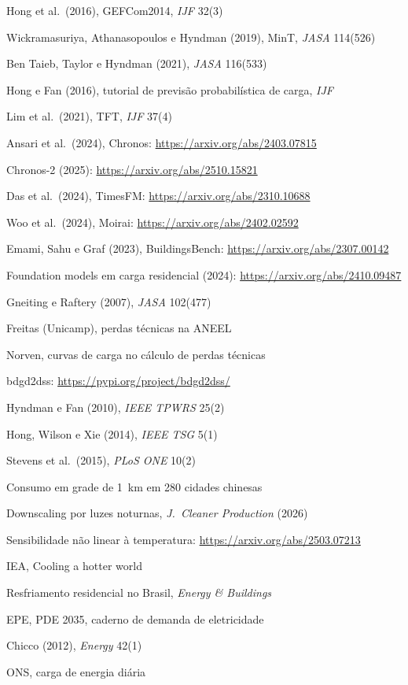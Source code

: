 {\begin{enumerate}[label={[\arabic*]},leftmargin=2.2em,itemsep=1pt]
\item Hong et al.\ (2016), GEFCom2014, \emph{IJF} 32(3)
\item Wickramasuriya, Athanasopoulos e Hyndman (2019), MinT, \emph{JASA} 114(526)
\item Ben Taieb, Taylor e Hyndman (2021), \emph{JASA} 116(533)
\item Hong e Fan (2016), tutorial de previsão probabilística de carga, \emph{IJF}
\item Lim et al.\ (2021), TFT, \emph{IJF} 37(4)
\item Ansari et al.\ (2024), Chronos: \url{https://arxiv.org/abs/2403.07815}
\item Chronos-2 (2025): \url{https://arxiv.org/abs/2510.15821}
\item Das et al.\ (2024), TimesFM: \url{https://arxiv.org/abs/2310.10688}
\item Woo et al.\ (2024), Moirai: \url{https://arxiv.org/abs/2402.02592}
\item Emami, Sahu e Graf (2023), BuildingsBench: \url{https://arxiv.org/abs/2307.00142}
\item Foundation models em carga residencial (2024): \url{https://arxiv.org/abs/2410.09487}
\item Gneiting e Raftery (2007), \emph{JASA} 102(477)
\item Freitas (Unicamp), perdas técnicas na ANEEL
\item Norven, curvas de carga no cálculo de perdas técnicas
\item bdgd2dss: \url{https://pypi.org/project/bdgd2dss/}
\item Hyndman e Fan (2010), \emph{IEEE TPWRS} 25(2)
\item Hong, Wilson e Xie (2014), \emph{IEEE TSG} 5(1)
\item Stevens et al.\ (2015), \emph{PLoS ONE} 10(2)
\item Consumo em grade de 1~km em 280 cidades chinesas
\item Downscaling por luzes noturnas, \emph{J.\ Cleaner Production} (2026)
\item Sensibilidade não linear à temperatura: \url{https://arxiv.org/abs/2503.07213}
\item IEA, Cooling a hotter world
\item Resfriamento residencial no Brasil, \emph{Energy \& Buildings}
\item EPE, PDE 2035, caderno de demanda de eletricidade
\item Chicco (2012), \emph{Energy} 42(1)
\item ONS, carga de energia diária

\end{enumerate}}
